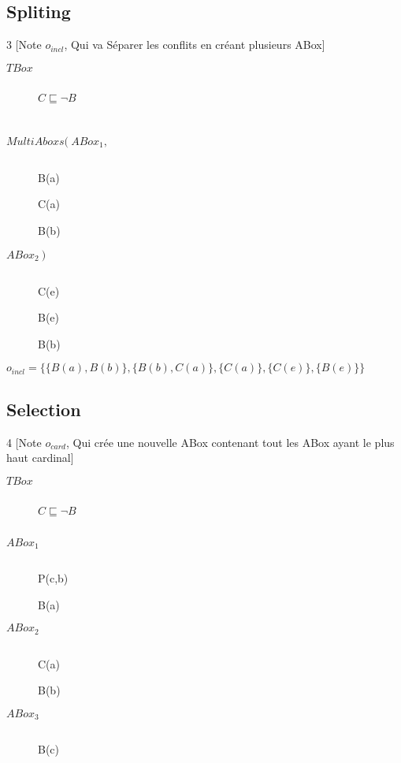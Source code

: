 \subsection{Spliting}
\begin{multicols}{3}
[Note $o_{incl}$, Qui va Séparer les conflits en créant plusieurs ABox]
\begin{description}
\item[$TBox$] $ $
\item[] $C \sqsubseteq \neg B$
\item[] $ $
\item[] $ $
\end{description}
\begin{description}
\item[$MultiAboxs(\ ABox_1,$] $ $
\item[] B(a)
\item[] C(a)
\item[] B(b)
\end{description}
\begin{description}
\item[$ABox_2\ )$] $ $
\item[] C(e)
\item[] B(e)
\item[] B(b)
\end{description}
\end{multicols}

$o_{incl} = \{\{B(a),B(b)\},\{B(b),C(a)\},\{C(a)\},\{C(e)\},\{B(e)\}\}$\\

\pagebreak
\subsection{Selection}
\begin{multicols}{4}
[Note $o_{card}$, Qui crée une nouvelle ABox contenant tout les ABox ayant le plus haut cardinal]
\begin{description}
\item[$TBox$] $ $
\item[] $C \sqsubseteq \neg B$
\item[] $ $
\end{description}
\begin{description}
\item[$ABox_1$] $ $
\item[] P(c,b)
\item[] B(a)
\end{description}
\begin{description}
\item[$ABox_2$] $ $
\item[] C(a)
\item[] B(b)
\end{description}
\begin{description}
\item[$ABox_3$] $ $
\item[] B(c)
\item[] $ $
\end{description}
\end{multicols}

